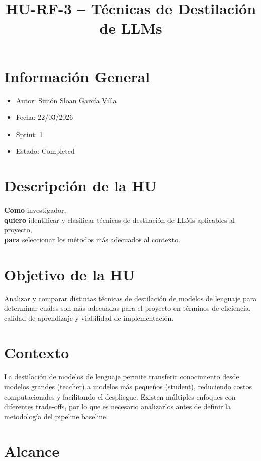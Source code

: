 \documentclass[12pt]{article}
\title{HU-RF-3 -- Técnicas de Destilación de LLMs}
\author{}
\date{}
\begin{document}
	\maketitle
	\newpage
	\tableofcontents
	\newpage
	
	\section{Información General}
	\begin{itemize}
		\item Autor: Simón Sloan García Villa
		\item Fecha: 22/03/2026
		\item Sprint: 1
		\item Estado: Completed
	\end{itemize}
	
	\section{Descripción de la HU}
	\textbf{Como} investigador, \\
	\textbf{quiero} identificar y clasificar técnicas de destilación de LLMs aplicables al proyecto, \\
	\textbf{para} seleccionar los métodos más adecuados al contexto.
	
	\section{Objetivo de la HU}
	Analizar y comparar distintas técnicas de destilación de modelos de lenguaje para determinar cuáles son más adecuadas para el proyecto en términos de eficiencia, calidad de aprendizaje y viabilidad de implementación.
	
	\section{Contexto}
	La destilación de modelos de lenguaje permite transferir conocimiento desde modelos grandes (teacher) a modelos más pequeños (student), reduciendo costos computacionales y facilitando el despliegue. Existen múltiples enfoques con diferentes trade-offs, por lo que es necesario analizarlos antes de definir la metodología del pipeline baseline.
	
	\section{Alcance}
	
\end{document}
